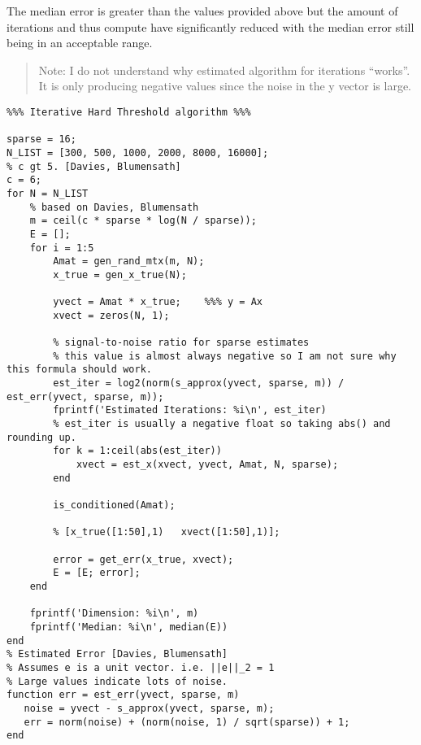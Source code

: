 \documentclass[11pt]{article}
\begin{document}
The median error is greater than the values provided above but the amount of
iterations and thus compute have significantly reduced with the median error
still being in an acceptable range.

\begin{quote}
Note: I do not understand why estimated algorithm for iterations ``works''. It is
only producing negative values since the noise in the y vector is large.
\end{quote}

\begin{verbatim}
%%% Iterative Hard Threshold algorithm %%%

sparse = 16;
N_LIST = [300, 500, 1000, 2000, 8000, 16000];
% c gt 5. [Davies, Blumensath]
c = 6;
for N = N_LIST
    % based on Davies, Blumensath
    m = ceil(c * sparse * log(N / sparse));
    E = [];
    for i = 1:5
        Amat = gen_rand_mtx(m, N);
        x_true = gen_x_true(N);

        yvect = Amat * x_true;    %%% y = Ax
        xvect = zeros(N, 1);

        % signal-to-noise ratio for sparse estimates
        % this value is almost always negative so I am not sure why this formula should work.
        est_iter = log2(norm(s_approx(yvect, sparse, m)) / est_err(yvect, sparse, m));
        fprintf('Estimated Iterations: %i\n', est_iter)
        % est_iter is usually a negative float so taking abs() and rounding up.
        for k = 1:ceil(abs(est_iter))
            xvect = est_x(xvect, yvect, Amat, N, sparse);
        end

        is_conditioned(Amat);

        % [x_true([1:50],1)   xvect([1:50],1)];

        error = get_err(x_true, xvect);
        E = [E; error];
    end

    fprintf('Dimension: %i\n', m)
    fprintf('Median: %i\n', median(E))
end
% Estimated Error [Davies, Blumensath]
% Assumes e is a unit vector. i.e. ||e||_2 = 1
% Large values indicate lots of noise.
function err = est_err(yvect, sparse, m)
   noise = yvect - s_approx(yvect, sparse, m);
   err = norm(noise) + (norm(noise, 1) / sqrt(sparse)) + 1;
end
\end{verbatim}
\end{document}
